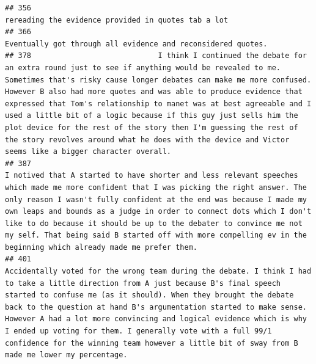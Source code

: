 \documentclass[
]{article}
\begin{document}
\begin{verbatim}
## 356                                                                                                                                                                                                                                                                                                                                                                                                                                                                                                                                               rereading the evidence provided in quotes tab a lot 
## 366                                                                                                                                                                                                                                                                                                                                                                                                                                                                                                                                      Eventually got through all evidence and reconsidered quotes. 
## 378                             I think I continued the debate for an extra round just to see if anything would be revealed to me. Sometimes that's risky cause longer debates can make me more confused. However B also had more quotes and was able to produce evidence that expressed that Tom's relationship to manet was at best agreeable and I used a little bit of a logic because if this guy just sells him the plot device for the rest of the story then I'm guessing the rest of the story revolves around what he does with the device and Victor seems like a bigger character overall.
## 387                                                                                                                    I notived that A started to have shorter and less relevant speeches which made me more confident that I was picking the right answer. The only reason I wasn't fully confident at the end was because I made my own leaps and bounds as a judge in order to connect dots which I don't like to do because it should be up to the debater to convince me not my self. That being said B started off with more compelling ev in the beginning which already made me prefer them. 
## 401                                                                              Accidentally voted for the wrong team during the debate. I think I had to take a little direction from A just because B's final speech started to confuse me (as it should). When they brought the debate back to the question at hand B's argumentation started to make sense. However A had a lot more convincing and logical evidence which is why I ended up voting for them. I generally vote with a full 99/1 confidence for the winning team however a little bit of sway from B made me lower my percentage. 

\end{verbatim}
\end{document}

